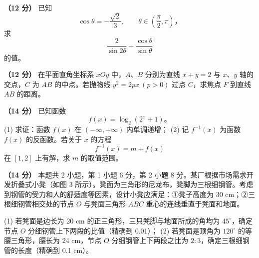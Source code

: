 \begin{question}
\textbf{（12 分）} 已知
\nopagebreak[4]
\[
\cos\theta=-\frac{\sqrt2}{3},\qquad \theta\in\left(\frac\pi2,\pi\right)\text{，}
\]
求
\nopagebreak[4]
\[
\frac2{\sin 2\theta}-\frac{\cos\theta}{\sin\theta}
\]
的值。

\end{question}
\begin{question}
\textbf{（12 分）} 在平面直角坐标系 \(xOy\) 中，\(A\text{、}B\) 分别为直线 \(x+y=2\) 与 \(x\text{、}y\) 轴的交点，\(C\) 为 \(AB\) 的中点。若抛物线 \(y^2=2px\ (p>0)\) 过点 \(C\)，求焦点 \(F\) 到直线 \(AB\) 的距离。

\end{question}
\begin{question}
\textbf{（14 分）} 已知函数
\nopagebreak[4]
\[
f(x)=\log_2(2^x+1)\text{。}
\]
(1) 求证：函数 \(f(x)\) 在 \((-\infty,+\infty)\) 内单调递增；
(2) 记 \(f^{-1}(x)\) 为函数 \(f(x)\) 的反函数。若关于 \(x\) 的方程
\nopagebreak[4]
   \[
   f^{-1}(x)=m+f(x)
   \]
   在 \([1,2]\) 上有解，求 \(m\) 的取值范围。

\Needspace{0.4\textheight}
\end{question}
\begin{question}
\textbf{（14 分）} 本题共 2 小题，第 1 小题 6 分，第 2 小题 8 分。某厂根据市场需求开发折叠式小凳（如图 3 所示）。凳面为三角形的尼龙布，凳脚为三根细钢管。考虑到钢管的受力和人的舒适度等因素，设计小凳应满足：①凳子高度为 30 cm；②三根细钢管相交处的节点 \(O\) 与凳面三角形 \(ABC\) 重心的连线垂直于凳面和地面。
\nopagebreak[4]
\begin{center}\end{center}
\nopagebreak[4]
(1) 若凳面是边长为 20 cm 的正三角形，三只凳脚与地面所成的角均为 \(45^\circ\)，确定节点 \(O\) 分细钢管上下两段的比值（精确到 0.01）；
(2) 若凳面是顶角为 \(120^\circ\) 的等腰三角形，腰长为 24 cm，节点 \(O\) 分细钢管上下两段之比为 \(2:3\)，确定三根细钢管的长度（精确到 0.1 cm）。

\end{question}
